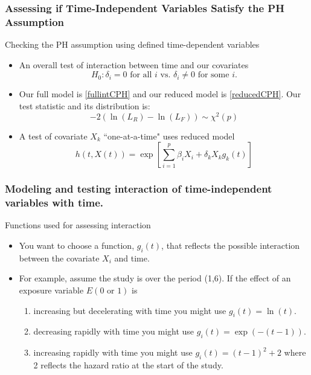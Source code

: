 \documentclass{beamer}
\theoremstyle{definition}
\begin{document}
\begin{frame}
\frametitle{Assessing if Time-Independent Variables Satisfy the PH Assumption}
\begin{block}{Checking the PH assumption using defined time-dependent variables}
\begin{itemize}
\item An overall test of interaction between time and our covariates
\[
H_0: \delta_i = 0 \text{ for all } i \text{ vs. } \delta_i \neq 0 \text{ for some } i.
\]
\item Our full model is \eqref{fullintCPH} and our reduced model is \eqref{reducedCPH}. Our test statistic and its distribution is:
\vspace{-10pt}
\[
-2(\ln(L_R) - \ln(L_F)) \sim \chi^2(p)
\]
\item A test of covariate $X_k$ ``one-at-a-time" uses reduced model
\vspace{-10pt}
\[
h(t,X(t)) = \exp\left[\sum_{i=1}^p \beta_i X_i + \delta_k X_k g_k(t)\right]
\]
\end{itemize}
\end{block}
\end{frame}

\begin{frame}
\frametitle{Modeling and testing interaction of time-independent variables with time.}
\begin{block}{Functions used for assessing interaction}
\begin{itemize}
\item You want to choose a function, $g_i(t)$, that reflects the possible interaction between the covariate $X_i$ and time.
\item For example, assume the study is over the period (1,6). If the effect of an exposure variable $E (0 \text{ or } 1)$ is
\begin{enumerate}
\item increasing but decelerating with time you might use $g_i(t)= \ln(t)$.
\item decreasing rapidly with time you might use $g_i(t)=\exp(-(t-1))$.
\item increasing rapidly with time you might use $g_i(t)=(t-1)^2+2$ where 2 reflects the hazard ratio at the start of the study.
\end{enumerate}
\end{itemize}
\end{block}
\end{frame}
\end{document}
